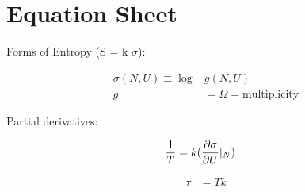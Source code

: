 

\section{Equation Sheet}


Forms of Entropy (S = k $\sigma$):

\begin{align}
    \sigma (N, U) \equiv \log &g(N,U) \\
    g &= \Omega = \text{multiplicity} 
\end{align}

Partial derivatives:

\begin{align}
    \frac{1}{T} &= k (\pdv{\sigma}{U}|_N)
\end{align}

\begin{align*}
    \tau &= Tk
\end{align*}